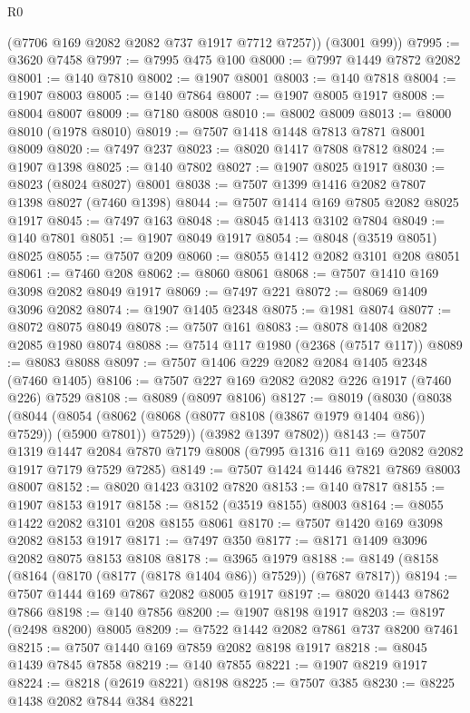 \begin{lexlean}{R0}
\begin{coremodule}
        (@7706 @169 @2082 @2082 @737 @1917 @7712 @7257))
      (@3001 @99))
@7995 := @3620 @7458
@7997 := @7995 @475 @100
@8000 := @7997 @1449 @7872 @2082
@8001 := @140 @7810
@8002 := @1907 @8001
@8003 := @140 @7818
@8004 := @1907 @8003
@8005 := @140 @7864
@8007 := @1907 @8005 @1917
@8008 := @8004 @8007
@8009 := @7180 @8008
@8010 := @8002 @8009
@8013 := @8000 @8010 (@1978 @8010)
@8019 := @7507 @1418 @1448 @7813 @7871 @8001 @8009
@8020 := @7497 @237
@8023 := @8020 @1417 @7808 @7812
@8024 := @1907 @1398
@8025 := @140 @7802
@8027 := @1907 @8025 @1917
@8030 := @8023 (@8024 @8027) @8001
@8038 := @7507 @1399 @1416 @2082 @7807 @1398 @8027 (@7460 @1398)
@8044 := @7507 @1414 @169 @7805 @2082 @8025 @1917
@8045 := @7497 @163
@8048 := @8045 @1413 @3102 @7804
@8049 := @140 @7801
@8051 := @1907 @8049 @1917
@8054 := @8048 (@3519 @8051) @8025
@8055 := @7507 @209
@8060 := @8055 @1412 @2082 @3101 @208 @8051
@8061 := @7460 @208
@8062 := @8060 @8061
@8068 := @7507 @1410 @169 @3098 @2082 @8049 @1917
@8069 := @7497 @221
@8072 := @8069 @1409 @3096 @2082
@8074 := @1907 @1405 @2348
@8075 := @1981 @8074
@8077 := @8072 @8075 @8049
@8078 := @7507 @161
@8083 := @8078 @1408 @2082 @2085 @1980 @8074
@8088 := @7514 @117 @1980 (@2368 (@7517 @117))
@8089 := @8083 @8088
@8097 := @7507 @1406 @229 @2082 @2084 @1405 @2348 (@7460 @1405)
@8106 := @7507 @227 @169 @2082 @2082 @226 @1917 (@7460 @226) @7529
@8108 := @8089 (@8097 @8106)
@8127 := @8019
    (@8030
      (@8038
        (@8044
          (@8054 (@8062 (@8068 (@8077 @8108 (@3867 @1979 @1404 @86)) @7529)) (@5900 @7801))
          @7529))
      (@3982 @1397 @7802))
@8143 := @7507
    @1319
    @1447
    @2084
    @7870
    @7179
    @8008
    (@7995 @1316 @11 @169 @2082 @2082 @1917 @7179 @7529 @7285)
@8149 := @7507 @1424 @1446 @7821 @7869 @8003 @8007
@8152 := @8020 @1423 @3102 @7820
@8153 := @140 @7817
@8155 := @1907 @8153 @1917
@8158 := @8152 (@3519 @8155) @8003
@8164 := @8055 @1422 @2082 @3101 @208 @8155 @8061
@8170 := @7507 @1420 @169 @3098 @2082 @8153 @1917
@8171 := @7497 @350
@8177 := @8171 @1409 @3096 @2082 @8075 @8153 @8108
@8178 := @3965 @1979
@8188 := @8149 (@8158 (@8164 (@8170 (@8177 (@8178 @1404 @86)) @7529)) (@7687 @7817))
@8194 := @7507 @1444 @169 @7867 @2082 @8005 @1917
@8197 := @8020 @1443 @7862 @7866
@8198 := @140 @7856
@8200 := @1907 @8198 @1917
@8203 := @8197 (@2498 @8200) @8005
@8209 := @7522 @1442 @2082 @7861 @737 @8200 @7461
@8215 := @7507 @1440 @169 @7859 @2082 @8198 @1917
@8218 := @8045 @1439 @7845 @7858
@8219 := @140 @7855
@8221 := @1907 @8219 @1917
@8224 := @8218 (@2619 @8221) @8198
@8225 := @7507 @385
@8230 := @8225 @1438 @2082 @7844 @384 @8221

\end{coremodule}
\end{lexlean}
